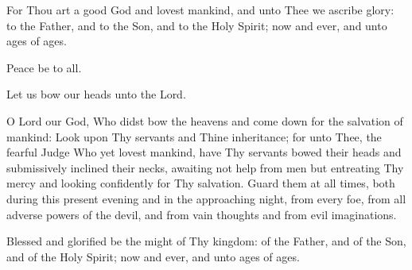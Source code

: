 \documentclass[twoside, letterpaper, 12pt]{report}
\begin{document}
\begin{maybetwocolumns}
\begin{priest}
\item For Thou art a good God and lovest mankind, and unto Thee we ascribe glory:
    to the Father, and to the Son, and to the Holy Spirit; now and ever, and unto ages of ages.
\end{priest}

\end{maybetwocolumns}


\begin{maybetwocolumns}
\begin{priest}
\item Peace be to all.
\end{priest}

\begin{deacon}
\item Let us bow our heads unto the Lord.
\end{deacon}


\begin{priest}
\item O Lord our God, Who didst bow the heavens and come down for the salvation of
    mankind: Look upon Thy servants and Thine inheritance; for unto Thee, the fearful
    Judge Who yet lovest mankind, have Thy servants bowed their heads and
    submissively inclined their necks, awaiting not help from men but entreating Thy
    mercy and looking confidently for Thy salvation. Guard them at all times, both
    during this present evening and in the approaching night, from every foe, from all
    adverse powers of the devil, and from vain thoughts and from evil imaginations.
\item Blessed and glorified be the might of Thy kingdom: of the Father, and of the Son,
    and of the Holy Spirit; now and ever, and unto ages of ages.
\end{priest}

\end{maybetwocolumns}



\vbox{}
\end{document}

